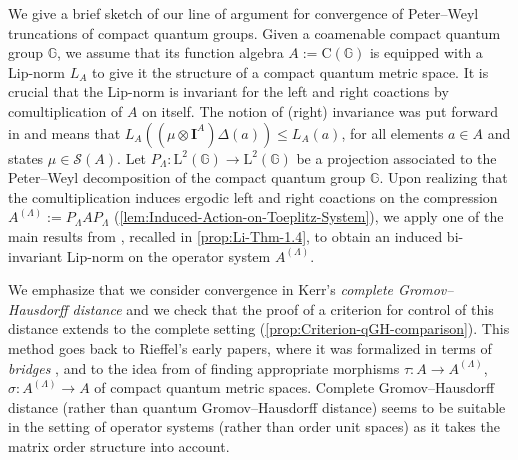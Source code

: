 \documentclass{amsart}
\theoremstyle{plain}
\theoremstyle{definition}
\theoremstyle{remark}
\begin{document}
	We give a brief sketch of our line of argument for convergence of Peter--Weyl truncations of compact quantum groups.
	Given a coamenable compact quantum group $\mathbb{G}$, we assume that its function algebra $A := \mathrm{C}(\mathbb{G})$ is equipped with a Lip-norm $L_A$ to give it the structure of a compact quantum metric space. 
	It is crucial that the Lip-norm is invariant for the left and right coactions by comultiplication of $A$ on itself.
	The notion of (right) invariance was put forward in \cite{Li09} and means that $L_A((\mu \otimes \mathbf{I}^A)\Delta(a)) \leq L_A(a)$, for all elements $a \in A$ and states $\mu \in \mathcal{S}(A)$.
	Let $P_\Lambda : \mathrm{L}^2(\mathbb{G}) \rightarrow \mathrm{L}^2(\mathbb{G})$ be a projection associated to the Peter--Weyl decomposition of the compact quantum group $\mathbb{G}$.
	Upon realizing that the comultiplication induces ergodic left and right coactions on the compression $A^{(\Lambda)} := P_\Lambda A P_\Lambda$ (\autoref{lem:Induced-Action-on-Toeplitz-System}), we apply one of the main results from \cite{Li09}, recalled in \autoref{prop:Li-Thm-1.4}, to obtain an induced bi-invariant Lip-norm on the operator system $A^{(\Lambda)}$.
	
	We emphasize that we consider convergence in Kerr's \emph{complete Gromov--Hausdorff distance} \cite{Ker03, KL07} and we check that the proof of a criterion for control of this distance \cite{KK22} extends to the complete setting (\autoref{prop:Criterion-qGH-comparison}).
	This method goes back to Rieffel's early papers, where it was formalized in terms of \emph{bridges} \cite{Rie04}, and to the idea from \cite{vS21} of finding appropriate morphisms $\tau : A \rightarrow A^{(\Lambda)}$, $\sigma : A^{(\Lambda)} \rightarrow A$ of compact quantum metric spaces.
	Complete Gromov--Hausdorff distance (rather than quantum Gromov--Hausdorff distance) seems to be suitable in the setting of operator systems (rather than order unit spaces) as it takes the matrix order structure into account.
	
\end{document}
